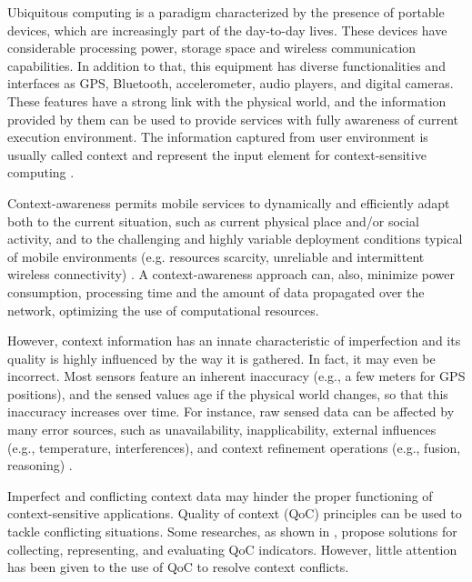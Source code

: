 \documentclass[letterpaper,conference]{IEEEtran}
\begin{document}
 Ubiquitous computing is a paradigm characterized by the presence of portable devices, 
 which are increasingly part of the day-to-day lives. These devices have considerable 
 processing power, storage space and wireless communication capabilities. In addition 
 to that, this equipment has diverse functionalities and interfaces as GPS, Bluetooth, 
 accelerometer, audio players, and digital cameras. These features have a strong link 
 with the physical world, and the information provided by them can be used to provide 
 services with fully awareness of current execution environment. The information 
 captured from user environment is usually called context and represent the input 
 element for context-sensitive computing \cite{nazario2012taxonomia}.

Context-awareness permits mobile services to dynamically and efficiently adapt both to 
the current situation, such as current physical place and/or social activity, and to 
the challenging and highly variable deployment conditions typical of mobile environments
(e.g. resources scarcity, unreliable and intermittent wireless connectivity) \cite{bellavista2013survey}. 
A context-awareness approach can, also, minimize power consumption, processing time and 
the amount of data propagated over the network, optimizing the use of computational resources.

However, context information has an innate characteristic of imperfection and its 
quality is highly influenced by the way it is gathered. In fact, it may even be 
incorrect. Most sensors feature an inherent inaccuracy (e.g., a few meters for GPS 
positions), and the sensed values age if the physical world changes, so that this 
inaccuracy increases over time. For instance, raw sensed data can be affected by many 
error sources, such as unavailability, inapplicability, external influences (e.g., 
temperature, interferences), and context refinement operations (e.g., fusion, reasoning)
\cite{henricksen2004modelling}.

Imperfect and conflicting context data may hinder the proper functioning of 
context-sensitive applications. Quality of context (QoC) principles can be used to 
tackle conflicting situations. Some researches, as shown in \cite{buchholz2003quality} \cite{sheikh2007middleware} \cite{klein2010time} \cite{neisse2008trustworthiness} 
\cite{manzoor2008evaluation} \cite{tang2007context}, propose solutions for collecting, 
representing, and evaluating QoC indicators. However, little attention has been given 
to the use of QoC to resolve context conflicts. 
\end{document}
